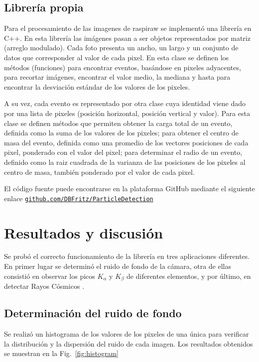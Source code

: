 \documentclass[twoside,twocolumn]{article}
\begin{document}
    \subsection{Librería propia}\label{sec:conf_exp:library}
      Para el procesamiento de las imagenes de raspiraw se implementó una librería en C++. En esta librería las imágenes pasan
      a ser objetos representados por matriz (arreglo modulado). Cada foto presenta un ancho, un largo y un conjunto de datos que
      corresponder al valor de cada pixel. En esta clase se definen los métodos (funciones) para encontrar eventos, basándose en
      pixeles adyacentes, para recortar imágenes, encontrar el valor medio, la mediana y hasta para encontrar
      la desviación estándar de los valores de los pixeles.

      A su vez, cada evento es representado por otra clase cuya identidad viene dado por una lista de pixeles (posición horizontal,
      posición vertical y valor). Para esta clase se definen métodos que permiten
      obtener la carga total de un evento, definida como la suma de los valores de los pixeles;
      para obtener el centro de masa del evento,
      definida como una promedio de los vectores posiciones de cada pixel,
      ponderado con el valor del pixel;
      para determinar el radio de un evento, definido como la raiz cuadrada de la varianza de las posiciones
      de los pixeles al centro de masa, también ponderado por el valor de cada pixel.

      El código fuente puede encontrarse en la plataforma GitHub mediante el siguiente enlace
      \href{https://github.com/DBFritz/ParticleDetections}{\texttt{github.com/DBFritz/ParticleDetection}}

  \section{Resultados y discusión}\label{sec:results}
    Se probó el correcto funcionamiento de la librería en tres aplicaciones diferentes.
    En primer lugar se determinó el ruido de fondo de la cámara,
    otra de ellas consistió en observar los picos $K_{\alpha}$ y $K_{\beta}$ de diferentes elementos,
    y por último, en detectar Rayos Cósmicos .

    \subsection{Determinación del ruido de fondo}\label{sec:results:background}
      Se realizó un histograma de los valores de los pixeles de una única para verificar la distribución y la dispersión
      del ruido de cada imagen. Los resultados obtenidos se muestran en la Fig.~\ref{fig:histogram}
\end{document}
